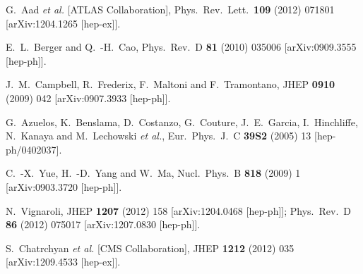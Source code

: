 \documentclass[12pt,a4paper]{article}
\begin{document}
\begin{thebibliography}{99}
  G.~Aad {\it et al.}  [ATLAS Collaboration],
  Phys.\ Rev.\ Lett.\  {\bf 109} (2012) 071801
  [arXiv:1204.1265 [hep-ex]].

  E.~L.~Berger and Q.~-H.~Cao,
  Phys.\ Rev.\ D {\bf 81} (2010) 035006
  [arXiv:0909.3555 [hep-ph]].

  J.~M.~Campbell, R.~Frederix, F.~Maltoni and F.~Tramontano,
  JHEP {\bf 0910} (2009) 042
  [arXiv:0907.3933 [hep-ph]].

  G.~Azuelos, K.~Benslama, D.~Costanzo, G.~Couture, J.~E.~Garcia, I.~Hinchliffe, N.~Kanaya and M.~Lechowski {\it et al.},
  Eur.\ Phys.\ J.\ C {\bf 39S2} (2005) 13
  [hep-ph/0402037].

  C.~-X.~Yue, H.~-D.~Yang and W.~Ma,
  Nucl.\ Phys.\ B {\bf 818} (2009) 1
  [arXiv:0903.3720 [hep-ph]].

  N.~Vignaroli,
  JHEP {\bf 1207} (2012) 158
  [arXiv:1204.0468 [hep-ph]];
  Phys.\ Rev.\ D {\bf 86} (2012) 075017
  [arXiv:1207.0830 [hep-ph]].






  S.~Chatrchyan {\it et al.}  [CMS Collaboration],
  JHEP {\bf 1212} (2012) 035
  [arXiv:1209.4533 [hep-ex]].


\end{thebibliography}
\end{document}
